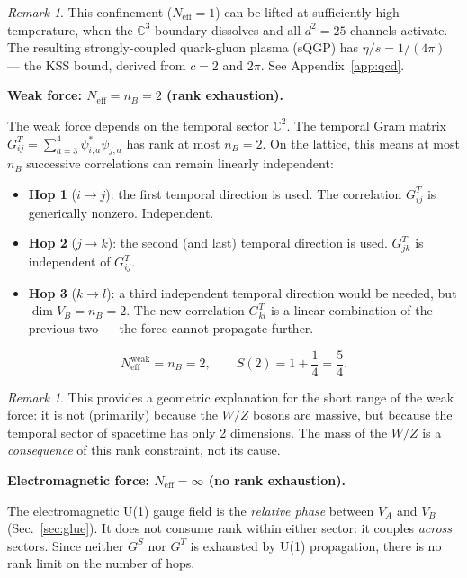 \documentclass[12pt]{article}
\theoremstyle{remark}
\newtheorem{remark}[theorem]{Remark}
\theoremstyle{definition}
\newcommand{\CC}{\mathbb{C}}
\begin{document}
\begin{remark}
This confinement ($N_\text{eff} = 1$) can be lifted at sufficiently high temperature, when the $\CC^3$ boundary dissolves and all $d^2 = 25$ channels activate. The resulting strongly-coupled quark-gluon plasma (sQGP) has $\eta/s = 1/(4\pi)$ --- the KSS bound, derived from $c = 2$ and $2\pi$. See Appendix~\ref{app:qcd}.
\end{remark}

\bigskip

\noindent\textbf{Weak force: $N_\text{eff} = n_B = 2$ (rank exhaustion).}

The weak force depends on the temporal sector $\CC^2$. The temporal Gram matrix $G^T_{ij} = \sum_{a=3}^{4}\psi^*_{i,a}\psi_{j,a}$ has rank at most $n_B = 2$. On the lattice, this means at most $n_B$ successive correlations can remain linearly independent:

\begin{itemize}
\item \textbf{Hop 1} ($i \to j$): the first temporal direction is used. The correlation $G^T_{ij}$ is generically nonzero. Independent.
\item \textbf{Hop 2} ($j \to k$): the second (and last) temporal direction is used. $G^T_{jk}$ is independent of $G^T_{ij}$.
\item \textbf{Hop 3} ($k \to l$): a third independent temporal direction would be needed, but $\dim V_B = n_B = 2$. The new correlation $G^T_{kl}$ is a linear combination of the previous two --- the force cannot propagate further.
\end{itemize}

\begin{equation}
N_\text{eff}^\text{weak} = n_B = 2, \qquad S(2) = 1 + \frac{1}{4} = \frac{5}{4}.
\end{equation}

\begin{remark}
This provides a geometric explanation for the short range of the weak force: it is not (primarily) because the $W/Z$ bosons are massive, but because the temporal sector of spacetime has only 2 dimensions. The mass of the $W/Z$ is a \emph{consequence} of this rank constraint, not its cause.
\end{remark}

\bigskip

\noindent\textbf{Electromagnetic force: $N_\text{eff} = \infty$ (no rank exhaustion).}

The electromagnetic U(1) gauge field is the \emph{relative phase} between $V_A$ and $V_B$ (Sec.~\ref{sec:glue}). It does not consume rank within either sector: it couples \emph{across} sectors. Since neither $G^S$ nor $G^T$ is exhausted by U(1) propagation, there is no rank limit on the number of hops.
\end{document}
